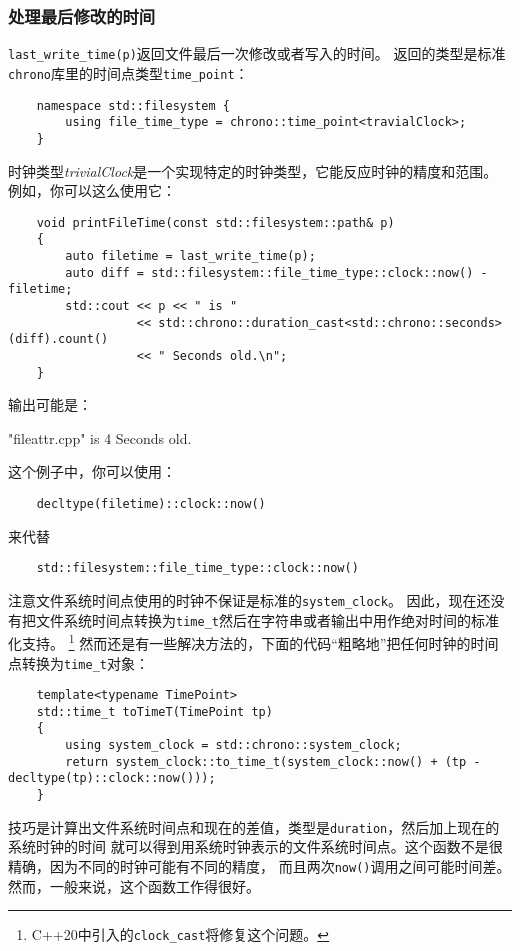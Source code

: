 \subsubsection{处理最后修改的时间}\label{ch20.4.1.3}
\texttt{last\_write\_time(p)}返回文件最后一次修改或者写入的时间。
返回的类型是标准\texttt{chrono}库里的时间点类型\texttt{time\_point}：
\begin{lstlisting}
    namespace std::filesystem {
        using file_time_type = chrono::time_point<travialClock>;
    }
\end{lstlisting}
时钟类型\emph{trivialClock}是一个实现特定的时钟类型，它能反应时钟的精度和范围。
例如，你可以这么使用它：
\begin{lstlisting}
    void printFileTime(const std::filesystem::path& p)
    {
        auto filetime = last_write_time(p);
        auto diff = std::filesystem::file_time_type::clock::now() - filetime;
        std::cout << p << " is "
                  << std::chrono::duration_cast<std::chrono::seconds>(diff).count()
                  << " Seconds old.\n";
    }
\end{lstlisting}
输出可能是：
\begin{blacklisting}
    "fileattr.cpp" is 4 Seconds old.
\end{blacklisting}
这个例子中，你可以使用：
\begin{lstlisting}
    decltype(filetime)::clock::now()
\end{lstlisting}
来代替
\begin{lstlisting}
    std::filesystem::file_time_type::clock::now()
\end{lstlisting}
注意文件系统时间点使用的时钟不保证是标准的\texttt{system\_clock}。
因此，现在还没有把文件系统时间点转换为\texttt{time\_t}然后在字符串或者输出中用作绝对时间的标准化支持。
\footnote{C++20中引入的\texttt{clock\_cast}将修复这个问题。}
然而还是有一些解决方法的，下面的代码“粗略地”把任何时钟的时间点转换为\texttt{time\_t}对象：
\begin{lstlisting}
    template<typename TimePoint>
    std::time_t toTimeT(TimePoint tp)
    {
        using system_clock = std::chrono::system_clock;
        return system_clock::to_time_t(system_clock::now() + (tp - decltype(tp)::clock::now()));
    }
\end{lstlisting}
技巧是计算出文件系统时间点和现在的差值，类型是\texttt{duration}，然后加上现在的系统时钟的时间
就可以得到用系统时钟表示的文件系统时间点。这个函数不是很精确，因为不同的时钟可能有不同的精度，
而且两次\texttt{now()}调用之间可能时间差。然而，一般来说，这个函数工作得很好。

